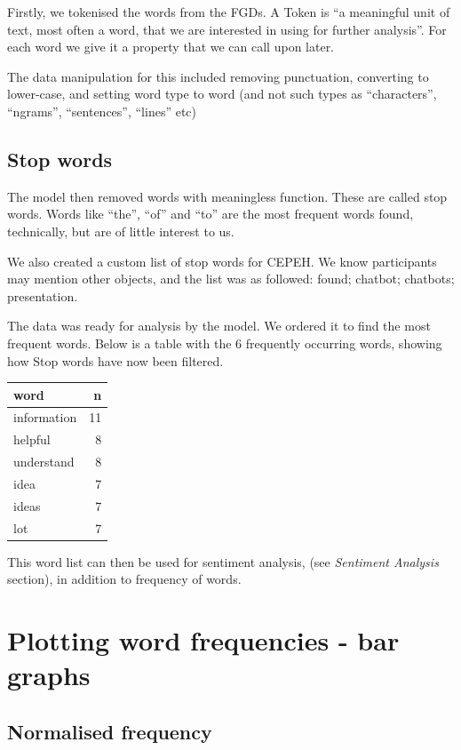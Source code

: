 \documentclass[a4paper, nobind]{templates/ociamthesis}
\begin{document}
Firstly, we tokenised the words from the FGDs. A Token is ``a meaningful
unit of text, most often a word, that we are interested in using for
further analysis''. For each word we give it a property that we can call
upon later.

The data manipulation for this included removing punctuation, converting
to lower-case, and setting word type to word (and not such types as
``characters'', ``ngrams'', ``sentences'', ``lines'' etc)

\hypertarget{stop-words}{%
\subsection{Stop words}\label{stop-words}}

The model then removed words with meaningless function. These are called
stop words. Words like ``the'', ``of'' and ``to'' are the most frequent words
found, technically, but are of little interest to us.

We also created a custom list of stop words for CEPEH. We know
participants may mention other objects, and the list was as followed:
found; chatbot; chatbots; presentation.

The data was ready for analysis by the model. We ordered it to find the
most frequent words. Below is a table with the 6 frequently occurring
words, showing how Stop words have now been filtered.

\begin{longtable}[]{@{}lr@{}}
\toprule()
word & n \\
\midrule()
\endhead
information & 11 \\
helpful & 8 \\
understand & 8 \\
idea & 7 \\
ideas & 7 \\
lot & 7 \\
\bottomrule()
\end{longtable}

This word list can then be used for sentiment analysis, (see \emph{Sentiment
Analysis} section), in addition to frequency of words.

\hypertarget{plotting-word-frequencies---bar-graphs}{%
\section{Plotting word frequencies - bar graphs}\label{plotting-word-frequencies---bar-graphs}}

\hypertarget{normalised-frequency}{%
\subsection{Normalised frequency}\label{normalised-frequency}}
\end{document}
